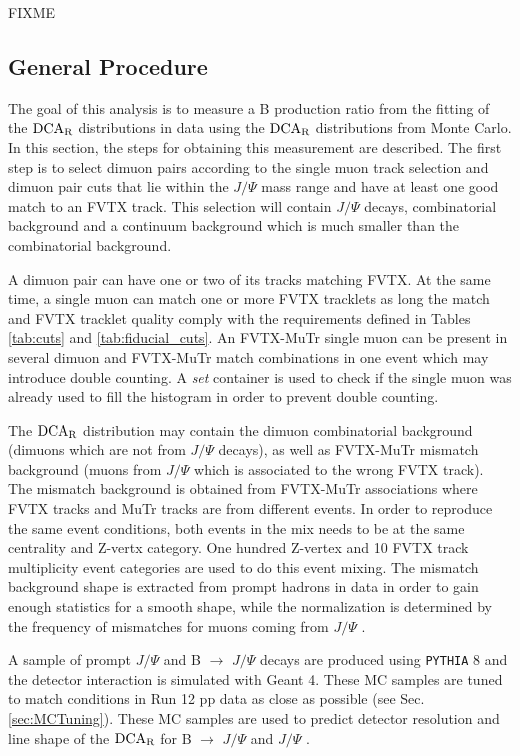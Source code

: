 \documentclass[12pt]{article}
\newcommand{\jpsi}{$J/\Psi$ }
\newcommand{\pythia}{\texttt{PYTHIA} }
\newcommand{\dcar}{$\rm{DCA}_{R}$ }
\begin{document}
{\color{red}FIXME}

\subsection{General Procedure}
The goal of this analysis is to measure a B production ratio from the fitting of the \dcar distributions
in data using the \dcar distributions from Monte Carlo.  In this section, the steps for obtaining this measurement are described.
The first step is to select dimuon pairs according to the single muon track selection and dimuon pair cuts that lie within the 
\jpsi mass range and have at least one good match to an FVTX track. This selection will contain \jpsi decays, combinatorial background 
and a continuum background which is much smaller than the combinatorial background.

A dimuon pair can have one or two of its tracks matching FVTX. At the same time, a single muon can match one or 
more FVTX tracklets as long the match and FVTX tracklet quality comply with the requirements defined in Tables \ref{tab:cuts} and \ref{tab:fiducial_cuts}.
 An FVTX-MuTr single muon can be present in several dimuon and FVTX-MuTr match combinations in one event which may introduce double counting.
 A \textit{set} container is used to check if the single muon was already used to fill the histogram in order to prevent double counting.

The \dcar distribution may contain the dimuon combinatorial background (dimuons which are not from \jpsi decays), as well as FVTX-MuTr mismatch 
background (muons from \jpsi which is associated to the wrong FVTX track). The mismatch background is obtained from FVTX-MuTr associations 
where FVTX tracks and MuTr tracks are from different events. In order to reproduce the same event conditions, both events in the mix needs to be 
at the same centrality and Z-vertx category. One hundred Z-vertex and 10 FVTX track multiplicity event categories are used to do this event mixing. 
The mismatch background shape is extracted from prompt hadrons in data in order to gain enough statistics for a smooth shape, while the normalization 
is determined by the frequency of mismatches for muons coming from \jpsi.

A sample of prompt \jpsi and B $\to$ \jpsi decays are produced using \pythia 8 and the detector interaction is simulated with Geant 4. 
These MC samples are tuned to match conditions in Run 12 pp data as close as possible (see Sec. \ref{sec:MCTuning}).  These MC samples 
are used to predict detector resolution and line shape of the \dcar for B $\to$ \jpsi and \jpsi.
\end{document}
